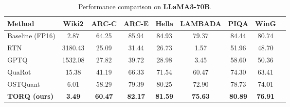 \begin{table}[h!]
\centering
\caption{Performance comparison on \textbf{LLaMA3-70B}.}
\label{tab:llama3_70b_full}
\begin{tabular}{lcccccccc}
\toprule
\textbf{Method} & \textbf{Wiki2} & \textbf{ARC-C} & \textbf{ARC-E} & \textbf{Hella} & \textbf{LAMBADA} & \textbf{PIQA} & \textbf{WinG} \\
\midrule
Baseline (FP16) & 2.87 & 64.25 & 85.94 & 84.93 & 79.37 & 84.44 & 80.74 \\
\midrule
RTN & 3180.43 & 25.09 & 31.44 & 26.73 & 1.57 & 51.96 & 48.70 \\
GPTQ & 1532.08 & 27.82 & 39.72 & 28.98 & 3.45 & 58.60 & 50.36 \\
QuaRot & 15.38 & 41.19 & 66.33 & 71.54 & 60.47 & 74.30 & 63.41 \\
OSTQuant & 6.01 & 58.29 & 79.39 & 80.25 & 72.90 & 78.73 & 74.01 \\
\textbf{TORQ (ours)} & \textbf{3.49} & \textbf{60.47} & \textbf{82.17} & \textbf{81.59} & \textbf{75.63} & \textbf{80.89} & \textbf{76.91} \\
\bottomrule
\end{tabular}
\end{table}
